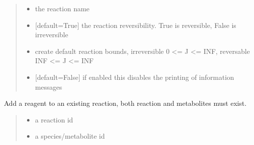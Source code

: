 \documentclass[letterpaper,12pt,english]{sphinxmanual}
\begin{document}
\begin{fulllineitems}
\begin{fulllineitems}
\begin{quote}
\begin{description}
\begin{itemize}
\item {} 
\sphinxAtStartPar
{} \textendash{} the reaction name

\item {} 
\sphinxAtStartPar
{} \textendash{} {[}default=True{]} the reaction reversibility. True is reversible, False is irreversible

\item {} 
\sphinxAtStartPar
{} \textendash{} create default reaction bounds, irreversible 0 \textless{}= J \textless{}= INF, reversable \sphinxhyphen{}INF \textless{}= J \textless{}= INF

\item {} 
\sphinxAtStartPar
{} \textendash{} {[}default=False{]} if enabled this disables the printing of information messages

\end{itemize}

\end{description}\end{quote}

\end{fulllineitems}


\begin{fulllineitems}
\label{\detokenize{api/core:cbmpy.CBModel.Model.createReactionReagent}}
\pysigstartsignatures
\pysiglinewithargsret
{}
{\sphinxparamcomma {}\sphinxparamcomma {}\sphinxparamcomma {}}
{}
\pysigstopsignatures
\sphinxAtStartPar
Add a reagent to an existing reaction, both reaction and metabolites must exist.
\begin{quote}\begin{description}
\begin{itemize}
\item {} 
\sphinxAtStartPar
{} \textendash{} a reaction id

\item {} 
\sphinxAtStartPar
{} \textendash{} a species/metabolite id


\end{itemize}
\end{description}
\end{quote}
\end{fulllineitems}
\end{fulllineitems}
\end{document}
